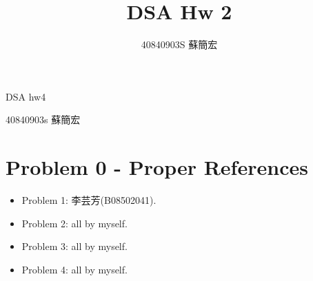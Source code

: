 \documentclass[12pt,a4paper,titlepage,AutoFakeBold]{article}
\title{DSA Hw 2}
\author{40840903S 蘇簡宏}
\begin{document}
\fontsize{12pt}{20pt}\selectfont

DSA hw4

40840903s 蘇簡宏


\section*{Problem 0 - Proper References}
\begin{itemize}[noitemsep]
    \item Problem 1: 李芸芳(B08502041).
    \item Problem 2: all by myself.
    \item Problem 3: all by myself.
    \item Problem 4: all by myself.
\end{itemize}

\newpage 
\end{document}
